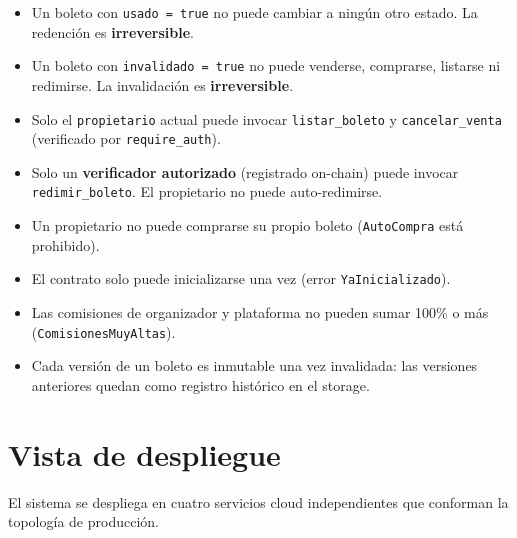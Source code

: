 \documentclass[12pt,oneside]{article}
\begin{document}
\begin{itemize}
  \item Un boleto con \texttt{usado = true} no puede cambiar a ningún otro estado. La redención es \textbf{irreversible}.
  \item Un boleto con \texttt{invalidado = true} no puede venderse, comprarse, listarse ni redimirse. La invalidación es \textbf{irreversible}.
  \item Solo el \texttt{propietario} actual puede invocar \texttt{listar\_boleto} y \texttt{cancelar\_venta} (verificado por \texttt{require\_auth}).
  \item Solo un \textbf{verificador autorizado} (registrado on-chain) puede invocar \texttt{redimir\_boleto}. El propietario no puede auto-redimirse.
  \item Un propietario no puede comprarse su propio boleto (\texttt{AutoCompra} está prohibido).
  \item El contrato solo puede inicializarse una vez (error \texttt{YaInicializado}).
  \item Las comisiones de organizador y plataforma no pueden sumar 100\% o más (\texttt{ComisionesMuyAltas}).
  \item Cada versión de un boleto es inmutable una vez invalidada: las versiones anteriores quedan como registro histórico en el storage.
\end{itemize}

\FloatBarrier
\clearpage
\section{Vista de despliegue}
\label{sec:vista-despliegue}

El sistema se despliega en cuatro servicios cloud independientes que conforman la topología de producción.
\end{document}
